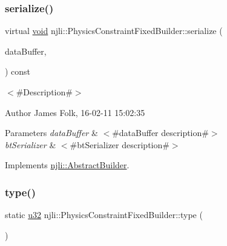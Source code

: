 \subsubsection{\texorpdfstring{serialize()}{serialize()}}
{\footnotesize\ttfamily virtual \mbox{\hyperlink{_thread_8h_af1e856da2e658414cb2456cb6f7ebc66}{void}} njli\+::\+Physics\+Constraint\+Fixed\+Builder\+::serialize (\begin{DoxyParamCaption}\item[{\mbox{\hyperlink{_thread_8h_af1e856da2e658414cb2456cb6f7ebc66}{void}} $\ast$}]{data\+Buffer,  }\item[{bt\+Serializer $\ast$}]{ }\end{DoxyParamCaption}) const\hspace{0.3cm}{\ttfamily [virtual]}}



$<$\#\+Description\#$>$ 

\begin{DoxyAuthor}{Author}
James Folk, 16-\/02-\/11 15\+:02\+:35
\end{DoxyAuthor}

\begin{DoxyParams}{Parameters}
{\em data\+Buffer} & $<$\#data\+Buffer description\#$>$ \\
\hline
{\em bt\+Serializer} & $<$\#bt\+Serializer description\#$>$ \\
\hline
\end{DoxyParams}


Implements \mbox{\hyperlink{classnjli_1_1_abstract_builder_ab66b774e02ccb9da554c9aab7fa6d981}{njli\+::\+Abstract\+Builder}}.

\mbox{\label{classnjli_1_1_physics_constraint_fixed_builder_a00525afcce888aef5d78deb6b6a9f482}} 
\subsubsection{\texorpdfstring{type()}{type()}}
{\footnotesize\ttfamily static \mbox{\hyperlink{_util_8h_a10e94b422ef0c20dcdec20d31a1f5049}{u32}} njli\+::\+Physics\+Constraint\+Fixed\+Builder\+::type (\begin{DoxyParamCaption}{ }\end{DoxyParamCaption})\hspace{0.3cm}{\ttfamily [static]}}

